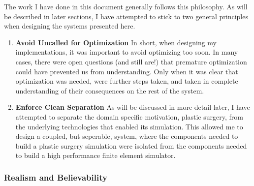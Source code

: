 \documentclass[12pt,oneside,letterpaper]{memoir}
\begin{document}
The work I have done in this document generally follows this
philosophy. As will be described in later sections, I have attempted
to stick to two general principles when designing the systems
presented here.

\begin{enumerate}
\item \textbf{Avoid Uncalled for Optimization} In short, when
  designing my implementations, it was important to avoid optimizing
  too soon. In many cases, there were open questions (and still are!)
  that premature optimization could have prevented us from
  understanding. Only when it was clear that optimization was needed,
  were further steps taken, and taken in complete understanding of
  their consequences on the rest of the system.

\item \textbf{Enforce Clean Separation} As will be discussed in more
  detail later, I have attempted to separate the domain specific
  motivation, plastic surgery, from the underlying technologies that
  enabled its simulation. This allowed me to design a coupled, but
  seperable, system, where the components needed to build a plastic
  surgery simulation were isolated from the components needed to build
  a high performance finite element simulator.
  
\end{enumerate}


\subsubsection{Realism and Believability}
\end{document}
